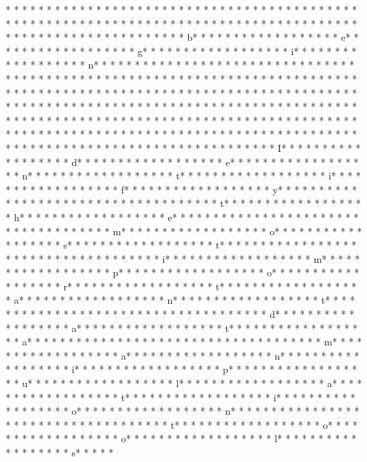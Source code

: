 * * *  * * *  * * *  *  * * *  *  * * *  * 	* * *  * * *  * * *  *  * * *  *  * * *  * 
* * *  * * *  * * *  *  * * *  *  * * *  * 	* * *  * * *  * * *  *  * * *  *  * * *  * 
* * *  * * *  * * *  *  * * *  *  * * *  * 	* * *  * * *  * * *  *  * * *  *  * * *  * b* * *  * * *  * * *  *  * * *  *  * * *  * e* * *  * * *  * * *  *  * * *  *  * * *  * g* * *  * * *  * * *  *  * * *  *  * * *  * i* * *  * * *  * * *  *  * * *  *  * * *  * n* * *  * * *  * * *  *  * * *  *  * * *  * {* * *  * * *  * * *  *  * * *  *  * * *  *  * * *  * * *  * * *  *  * * *  *  * * *  * }* * *  * * *  * * *  *  * * *  *  * * *  * 
* * *  * * *  * * *  *  * * *  *  * * *  * 	* * *  * * *  * * *  *  * * *  *  * * *  * 	* * *  * * *  * * *  *  * * *  *  * * *  * * *  * * *  *  * * *  *  * * *  * * *  * * *  *  * * *  *  * * *  *  * * *  * * *  * * *  *  * * *  *  * * *  *  * * *  * * *  * * *  *  * * *  *  * * *  *  * * *  * * *  * * *  *  * * *  *  * * *  *  * * *  * * *  * * *  *  * * *  *  * * *  *  * * *  * * *  * * *  *  * * *  *  * * *  *  * * *  * * *  * * *  *  * * *  *  * * *  *  * * *  * * *  * * *  *  * * *  *  * * *  * I* * *  * * *  * * *  *  * * *  *  * * *  * d* * *  * * *  * * *  *  * * *  *  * * *  * e* * *  * * *  * * *  *  * * *  *  * * *  * n* * *  * * *  * * *  *  * * *  *  * * *  * t* * *  * * *  * * *  *  * * *  *  * * *  * i* * *  * * *  * * *  *  * * *  *  * * *  * f* * *  * * *  * * *  *  * * *  *  * * *  * y* * *  * * *  * * *  *  * * *  *  * * *  *  * * *  * * *  * * *  *  * * *  *  * * *  * t* * *  * * *  * * *  *  * * *  *  * * *  * h* * *  * * *  * * *  *  * * *  *  * * *  * e* * *  * * *  * * *  *  * * *  *  * * *  *  * * *  * * *  * * *  *  * * *  *  * * *  * m* * *  * * *  * * *  *  * * *  *  * * *  * o* * *  * * *  * * *  *  * * *  *  * * *  * s* * *  * * *  * * *  *  * * *  *  * * *  * t* * *  * * *  * * *  *  * * *  *  * * *  *  * * *  * * *  * * *  *  * * *  *  * * *  * i* * *  * * *  * * *  *  * * *  *  * * *  * m* * *  * * *  * * *  *  * * *  *  * * *  * p* * *  * * *  * * *  *  * * *  *  * * *  * o* * *  * * *  * * *  *  * * *  *  * * *  * r* * *  * * *  * * *  *  * * *  *  * * *  * t* * *  * * *  * * *  *  * * *  *  * * *  * a* * *  * * *  * * *  *  * * *  *  * * *  * n* * *  * * *  * * *  *  * * *  *  * * *  * t* * *  * * *  * * *  *  * * *  *  * * *  *  * * *  * * *  * * *  *  * * *  *  * * *  * d* * *  * * *  * * *  *  * * *  *  * * *  * a* * *  * * *  * * *  *  * * *  *  * * *  * t* * *  * * *  * * *  *  * * *  *  * * *  * a* * *  * * *  * * *  *  * * *  *  * * *  *  * * *  * * *  * * *  *  * * *  *  * * *  * m* * *  * * *  * * *  *  * * *  *  * * *  * a* * *  * * *  * * *  *  * * *  *  * * *  * n* * *  * * *  * * *  *  * * *  *  * * *  * i* * *  * * *  * * *  *  * * *  *  * * *  * p* * *  * * *  * * *  *  * * *  *  * * *  * u* * *  * * *  * * *  *  * * *  *  * * *  * l* * *  * * *  * * *  *  * * *  *  * * *  * a* * *  * * *  * * *  *  * * *  *  * * *  * t* * *  * * *  * * *  *  * * *  *  * * *  * i* * *  * * *  * * *  *  * * *  *  * * *  * o* * *  * * *  * * *  *  * * *  *  * * *  * n* * *  * * *  * * *  *  * * *  *  * * *  *  * * *  * * *  * * *  *  * * *  *  * * *  * t* * *  * * *  * * *  *  * * *  *  * * *  * o* * *  * * *  * * *  *  * * *  *  * * *  * o* * *  * * *  * * *  *  * * *  *  * * *  * l* * *  * * *  * * *  *  * * *  *  * * *  * s* * *  * * 